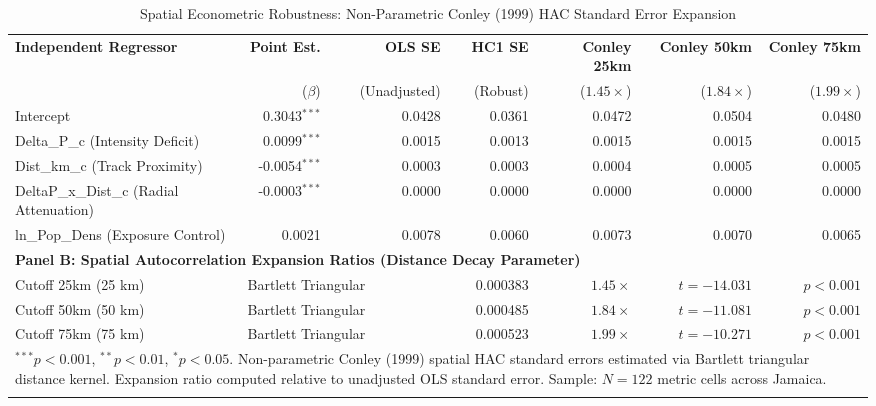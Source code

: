 \begin{table}[h!]
\centering
\small
\setlength{\tabcolsep}{4.5pt}
\caption{Spatial Econometric Robustness: Non-Parametric Conley (1999) HAC Standard Error Expansion}
\label{tab:conley_se_expansion}
\begin{tabularx}{\textwidth}{X r r r r r r}
\toprule
\textbf{Independent Regressor} & \textbf{Point Est.} & \textbf{OLS SE} & \textbf{HC1 SE} & \textbf{Conley 25km} & \textbf{Conley 50km} & \textbf{Conley 75km} \\
 & ($\beta$) & (Unadjusted) & (Robust) & ($1.45\times$) & ($1.84\times$) & ($1.99\times$) \\
\midrule
Intercept & 0.3043$^{***}$ & 0.0428 & 0.0361 & 0.0472 & 0.0504 & 0.0480 \\
Delta\_P\_c (Intensity Deficit) & 0.0099$^{***}$ & 0.0015 & 0.0013 & 0.0015 & 0.0015 & 0.0015 \\
Dist\_km\_c (Track Proximity) & -0.0054$^{***}$ & 0.0003 & 0.0003 & 0.0004 & 0.0005 & 0.0005 \\
DeltaP\_x\_Dist\_c (Radial Attenuation) & -0.0003$^{***}$ & 0.0000 & 0.0000 & 0.0000 & 0.0000 & 0.0000 \\
ln\_Pop\_Dens (Exposure Control) & 0.0021 & 0.0078 & 0.0060 & 0.0073 & 0.0070 & 0.0065 \\
\midrule
\multicolumn{7}{l}{\textbf{Panel B: Spatial Autocorrelation Expansion Ratios (Distance Decay Parameter)}} \\
\midrule
Cutoff 25km (25 km) & \multicolumn{2}{l}{Bartlett Triangular} & 0.000383 & $1.45\times$ & $t = -14.031$ & $p < 0.001$ \\
Cutoff 50km (50 km) & \multicolumn{2}{l}{Bartlett Triangular} & 0.000485 & $1.84\times$ & $t = -11.081$ & $p < 0.001$ \\
Cutoff 75km (75 km) & \multicolumn{2}{l}{Bartlett Triangular} & 0.000523 & $1.99\times$ & $t = -10.271$ & $p < 0.001$ \\
\bottomrule
\multicolumn{7}{X}{\footnotesize $^{***}p < 0.001$, $^{**}p < 0.01$, $^{*}p < 0.05$. Non-parametric Conley (1999) spatial HAC standard errors estimated via Bartlett triangular distance kernel. Expansion ratio computed relative to unadjusted OLS standard error. Sample: $N=122$ metric cells across Jamaica.} \\\\
\end{tabularx}
\end{table}
